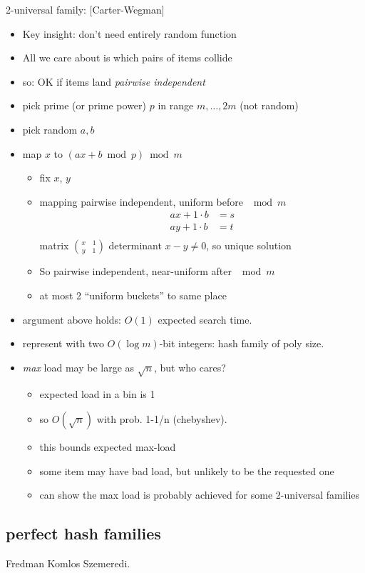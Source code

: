 \documentclass[12pt]{article}
\begin{document}
2-universal family: [Carter-Wegman]
\begin{itemize}
\item Key insight: don't need entirely random function
\item All we care about is which pairs of items collide
\item so: OK if items land \emph{pairwise independent}
\item pick prime (or prime power) $p$ in range $m,\ldots,2m$ (not random)
\item pick random $a,b$
\item map $x$ to $(ax + b \bmod p)\bmod m$
  \begin{itemize}
  \item fix $x$, $y$
  \item mapping pairwise independent, uniform before $\mod m$
  \begin{align*}
     ax+1\cdot b &= s\\
     ay+1\cdot b &= t\\
  \end{align*}
  matrix $\binom{x\quad 1}{y \quad 1}$ determinant $x-y \ne 0$, so unique solution
  \item So pairwise independent, near-uniform after $\mod m$
  \item at most 2 ``uniform buckets'' to same place
  \end{itemize}
\item argument above holds: $O(1)$ expected search time.
\item represent with two $O(\log m)$-bit integers: hash family of poly
  size.
\item \emph{max} load may be large as $\sqrt{n}$, but who cares?
  \begin{itemize}
  \item expected load in a bin is 1
  \item so $O(\sqrt{n})$ with prob. 1-1/n (chebyshev).
  \item this bounds expected max-load
  \item some item may have bad load, but unlikely to be the requested
  one
\item can show the max load is probably achieved for some 2-universal families
  \end{itemize}
\end{itemize}


\subsection*{perfect hash families}
Fredman Komlos Szemeredi.
\end{document}
